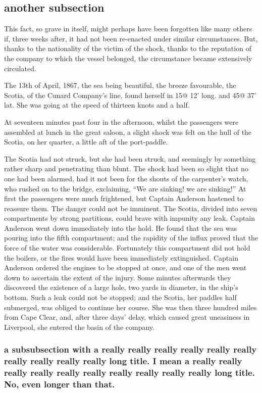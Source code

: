 \subsection{another subsection}

This fact, so grave in itself, might perhaps have been forgotten
like many others if, three weeks after, it had not been re-enacted
under similar circumstances.  But, thanks to the nationality of
the victim of the shock, thanks to the reputation of the company to
which the vessel belonged, the circumstance became extensively circulated.

The 13th of April, 1867, the sea being beautiful, the breeze favourable,
the Scotia, of the Cunard Company's line, found herself in 15@ 12' long.
and 45@ 37' lat.  She was going at the speed of thirteen knots and a half.

At seventeen minutes past four in the afternoon, whilst the passengers were
assembled at lunch in the great saloon, a slight shock was felt on the hull
of the Scotia, on her quarter, a little aft of the port-paddle.


The Scotia had not struck, but she had been struck, and seemingly
by something rather sharp and penetrating than blunt.
The shock had been so slight that no one had been alarmed,
had it not been for the shouts of the carpenter's watch,
who rushed on to the bridge, exclaiming, ``We are sinking! we
are sinking!''  At first the passengers were much frightened,
but Captain Anderson hastened to reassure them.  The danger could
not be imminent.  The Scotia, divided into seven compartments
by strong partitions, could brave with impunity any leak.
Captain Anderson went down immediately into the hold.
He found that the sea was pouring into the fifth compartment;
and the rapidity of the influx proved that the force of the water
was considerable.  Fortunately this compartment did not hold
the boilers, or the fires would have been immediately extinguished.
Captain Anderson ordered the engines to be stopped at once,
and one of the men went down to ascertain the extent of the injury.
Some minutes afterwards they discovered the existence of a
large hole, two yards in diameter, in the ship's bottom.
Such a leak could not be stopped; and the Scotia, her paddles
half submerged, was obliged to continue her course.  She was then
three hundred miles from Cape Clear, and, after three days' delay,
which caused great uneasiness in Liverpool, she entered the basin
of the company.

\subsubsection{a subsubsection with a really really really really really really really really really really long title. I mean a really really really really really really really really really really long title. No, even longer than that.}

